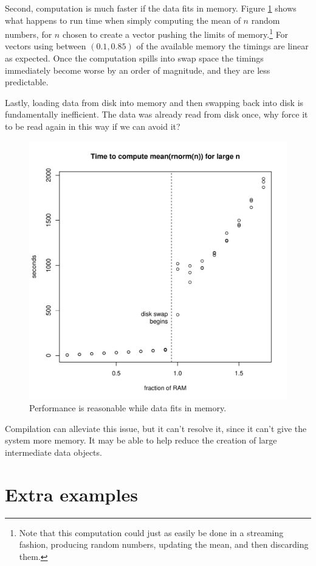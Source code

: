 \documentclass[12pt]{article}
\begin{document}
Second, computation is much faster if the data fits in memory.
Figure \ref{fig:spinning_disk_swap} shows what happens to run time when
simply computing the mean of $n$ random numbers, for $n$ chosen to create a
vector pushing the limits of memory.\footnote{Note that this computation
could just as easily be done in a streaming fashion, producing random
numbers, updating the mean, and then discarding them.} For vectors using between $(0.1, 0.85)$
of the available memory the timings are linear as expected.
Once the computation spills into swap space the timings immediately become
worse by an order of magnitude, and they are less predictable.

Lastly, loading data from disk into memory and then swapping back into disk
is fundamentally inefficient. The data was already read from disk once, why force it
to be read again in this way if we can avoid it?

\begin{figure}
\centering
\includegraphics[width=.8\linewidth]{swap/spinning_disk_swap}
\caption{Performance is reasonable while data fits in memory.}
\label{fig:spinning_disk_swap}
\end{figure}

Compilation can alleviate this issue, but it can't resolve it, since it
can't give the system more memory. It may be able to help reduce the
creation of large intermediate data objects.


\section{Extra examples}
\end{document}
